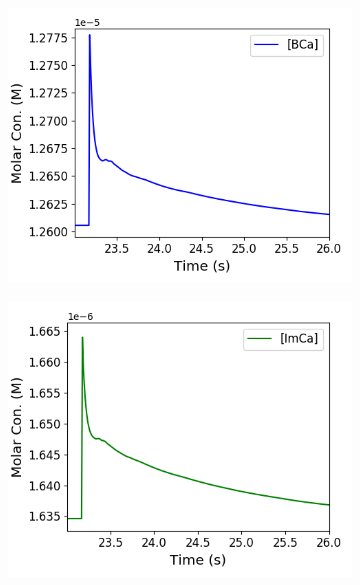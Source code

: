 \begin{figure}[p]
\begin{subfigure}{0.5\textwidth}
    \includegraphics[width=\textwidth]{figures/calcium_chapter/concentration_dynamics_18_zoomed_BCa.png}
    \caption{}
  \end{subfigure}
  \begin{subfigure}{0.5\textwidth}
    \includegraphics[width=\textwidth]{figures/calcium_chapter/concentration_dynamics_18_zoomed_ImCa.png}
    \caption{}
  \end{subfigure}
  \begin{subfigure}{0.5\textwidth}

\end{subfigure}
\end{figure}
